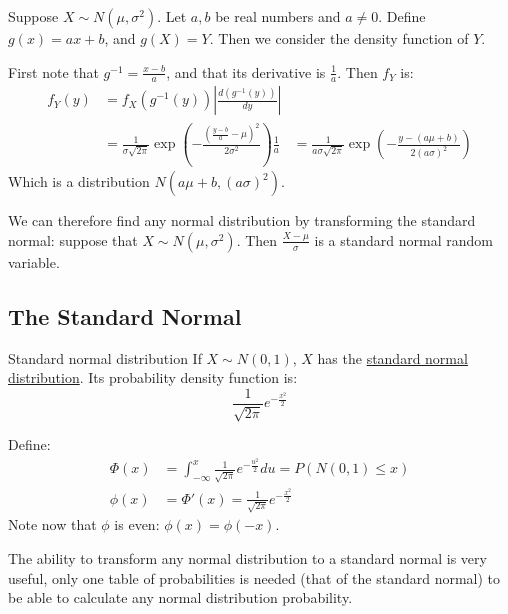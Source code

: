 \documentclass[../Main.tex]{subfiles}
\begin{document}
\begin{example}
    Suppose $X \sim N(\mu, \sigma^2)$. Let $a, b$ be real numbers and $a \neq 0$. Define $g(x) = ax + b$, and $g(X) = Y$. Then we consider the density function of $Y$.\par
    First note that $g^{-1} = \frac{x - b}{a}$, and that its derivative is $\frac{1}{a}$. Then $f_{Y}$ is:
    \begin{align*}
        f_Y(y) &= f_X (g^{-1}(y)) \left|\frac{d(g^{-1}(y))}{dy}\right| \\
        &= \frac{1}{\sigma\sqrt{2\pi}} \exp{\left(-\frac{\left(\frac{y - b}{a} - \mu\right)^2}{2\sigma^2}\right)} \frac{1}{a}
        &= \frac{1}{a\sigma\sqrt{2\pi}} \exp{\left(-\frac{y - (a\mu + b)}{2(a\sigma)^2}\right)}
    \end{align*}
    Which is a distribution $N(a\mu + b, (a\sigma)^2)$.\par
    We can therefore find any normal distribution by transforming the standard normal: suppose that $X \sim N(\mu, \sigma^2)$. Then $\frac{X - \mu}{\sigma}$ is a standard normal random variable.
\end{example}
\subsection{The Standard Normal}
\begin{definition}{Standard normal distribution}
    If $X \sim N(0, 1)$, $X$ has the \underline{standard normal distribution}. Its probability density function is:
    \begin{equation*}
        \frac{1}{\sqrt{2\pi}} e^{-\frac{x^2}{2}}
    \end{equation*}
\end{definition}
\begin{example}
    Define:
    \begin{align*}
        \Phi(x) &= \int_{-\infty}^x \frac{1}{\sqrt{2\pi}} e^{-\frac{u^2}{2}} du = P(N(0, 1) \leq x) \\
        \phi(x) &= \Phi'(x) = \frac{1}{\sqrt{2\pi}} e^{-\frac{x^2}{2}}
    \end{align*}
    Note now that $\phi$ is even: $\phi(x) = \phi(-x)$.
\end{example}
The ability to transform any normal distribution to a standard normal is very useful, only one table of probabilities is needed (that of the standard normal) to be able to calculate any normal distribution probability.
\end{document}
